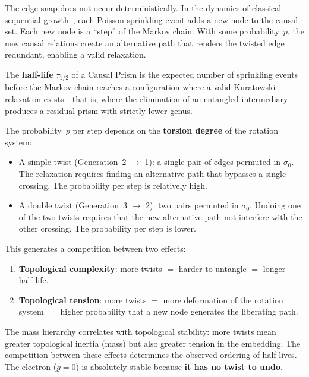 The edge snap does not occur deterministically. In the dynamics
of classical sequential growth~\cite{rideout2000}, each Poisson
sprinkling event adds a new node to the causal set. Each new
node is a ``step'' of the Markov chain. With some probability~$p$,
the new causal relations create an alternative path that renders
the twisted edge redundant, enabling a valid relaxation.

\begin{definition}
\label{def:hitting-time}
The \textbf{half-life} $\tau_{1/2}$ of a Causal Prism is the expected
number of sprinkling events before the Markov chain
reaches a configuration where a valid Kuratowski relaxation
exists---that is, where the elimination of an entangled intermediary
produces a residual prism with strictly lower genus.
\end{definition}

The probability~$p$ per step depends on the \textbf{torsion degree} of
the rotation system:

\begin{itemize}
  \item A simple twist (Generation~2 $\to$ 1): a single pair of edges
        permuted in $\sigma_0$. The relaxation requires finding an
        alternative path that bypasses a single crossing. The probability
        per step is relatively high.
  \item A double twist (Generation~3 $\to$ 2): two pairs permuted in
        $\sigma_0$. Undoing one of the two twists requires that the
        new alternative path not interfere with the other crossing.
        The probability per step is lower.
\end{itemize}

This generates a competition between two effects:
\begin{enumerate}
  \item \textbf{Topological complexity}: more twists $=$ harder
        to untangle $=$ longer half-life.
  \item \textbf{Topological tension}: more twists $=$ more deformation
        of the rotation system $=$ higher probability that a new
        node generates the liberating path.
\end{enumerate}

\begin{result}[title={Mass hierarchy and topological stability}]
The mass hierarchy correlates with topological stability:
more twists mean greater topological inertia (mass) but also
greater tension in the embedding. The competition between these effects
determines the observed ordering of half-lives. The electron
($g = 0$) is absolutely stable because \textbf{it has no twist to
undo}.
\end{result}

